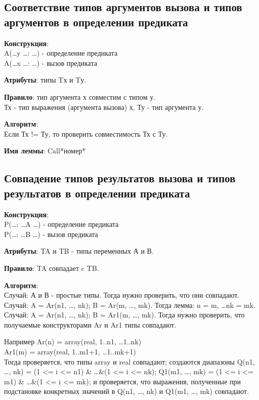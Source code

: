 \documentclass[12pt,a4paper]{article}
\begin{document}
\subsection{Соответствие типов аргументов вызова и типов аргументов в определении предиката}
\textbf{Конструкция}: \\
A(\dots y \dots: \dots) - определение предиката\\
A(\dots x \dots: \dots) - вызов предиката

\textbf{Атрибуты}: типы Tх и Tу.

\textbf{Правило}: тип аргумента  х совместим с типом у. \\
Тх - тип выражения (аргумента вызова)  х, Ту - тип аргумента у.

\textbf{Алгоритм}: \\
Если Тх != Ту, то проверить совместимость Тх с Ту.

\textbf{Имя леммы}: Call*номер*


\subsection{Совпадение типов результатов вызова и типов результатов в определении предиката}
\textbf{Конструкция}: \\
P(\dots: \dots A \dots) - определение предиката\\
P(\dots: \dots B \dots) - вызов предиката

\textbf{Атрибуты}: TA и TB - типы переменных А и В.

\textbf{Правило}: TA совпадает c TB.

\textbf{Алгоритм}: \\
Случай: А и В - простые типы. Тогда нужно проверить, что они совпадают. \\
Случай: A = Ar(n1, \dots , nk); B = Ar(m, \dots , mk). Тогда лемма: n = m, \dots nk = mk. \\
Случай: A = Ar(n1, \dots , nk); B = Ar1(m, \dots , mk). Тогда нужно проверить, что получаемые конструкторами Ar и Ar1 типы совпадают.

Например Ar(n) = array(real, 1..n1, \dots 1..nk) \\
Ar1(m) = array(real, 1..m1+1, \dots 1..mk+1) \\
Тогда проверяется, что типы array и real совпадают; создаются диапазоны Q(n1, \dots , nk) = (1 <= i <= n1) \& \dots \&(1 <= i <= nk); Q1(m1, \dots , mk) = (1 <= i <= m1) \& \dots \&(1 <= i <= mk); и проверяется, что выражения, полученные при подстановке конкретных значений в Q(n1, \dots , nk) и Q1(m1, \dots , mk) совпадают.
\end{document}
